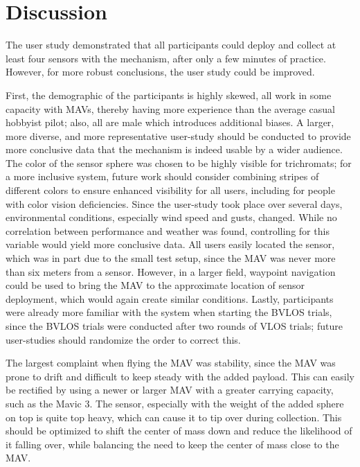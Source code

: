 


\section{Discussion}

The user study demonstrated that all participants could deploy and collect at least four sensors with the mechanism, after only a few minutes of practice. However, for more robust conclusions, the user study could be improved.

First, the demographic of the participants is highly skewed, all work in some capacity with \acp{MAV}, thereby having more experience than the average casual hobbyist pilot; also, all are male which introduces additional biases. A larger, more diverse, and more representative user-study should be conducted to provide more conclusive data that the mechanism is indeed usable by a wider audience. The color of the sensor sphere was chosen to be highly visible for trichromats; for a more inclusive system, future work should consider combining stripes of different colors to ensure enhanced visibility for all users, including for people with color vision deficiencies. Since the user-study took place over several days, environmental conditions, especially wind speed and gusts, changed. While no correlation between performance and weather was found, controlling for this variable would yield more conclusive data. All users easily located the sensor, which was in part due to the small test setup, since the \ac{MAV} was never more than six meters from a sensor. However, in a larger field, waypoint navigation could be used to bring the \ac{MAV} to the approximate location of sensor deployment, which would again create similar conditions.  
Lastly, participants were already more familiar with the system when starting the \ac{BVLOS} trials, since the \ac{BVLOS} trials were conducted after two rounds of \ac{VLOS} trials; future user-studies should randomize the order to correct this.

The largest complaint when flying the \ac{MAV} was stability, since the \ac{MAV} was prone to drift and difficult to keep steady with the added payload. This can easily be rectified by using a newer or larger \ac{MAV} with a greater carrying capacity, such as the Mavic 3.
The sensor, especially with the weight of the added sphere on top is quite top heavy, which can cause it to tip over during collection. This should be optimized to shift the center of mass down and reduce the likelihood of it falling over, while balancing the need to keep the center of mass close to the MAV.

